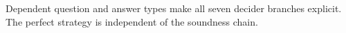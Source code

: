 
Dependent question and answer types make all seven decider branches explicit.
The perfect strategy is independent of the soundness chain.


